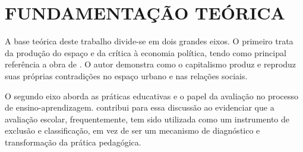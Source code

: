 \chapter{FUNDAMENTAÇÃO TEÓRICA}

A base teórica deste trabalho divide-se em dois grandes eixos. O primeiro trata da produção do espaço e da crítica à economia política, tendo como principal referência a obra de \cite{dask1}. O autor demonstra como o capitalismo produz e reproduz suas próprias contradições no espaço urbano e nas relações sociais.

O segundo eixo aborda as práticas educativas e o papel da avaliação no processo de ensino-aprendizagem. \cite{luckesi-avaprend} contribui para essa discussão ao evidenciar que a avaliação escolar, frequentemente, tem sido utilizada como um instrumento de exclusão e classificação, em vez de ser um mecanismo de diagnóstico e transformação da prática pedagógica.